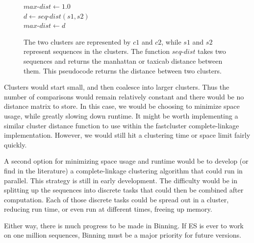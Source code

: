 \begin{figure}[h!]
\begin{algorithm}[H]
 \SetAlgoLined

\BlankLine
 $max$-$dist \gets 1.0$\\
  {
    {
    $d \gets seq$-$dist(s1, s2)$\\
     {
      $max$-$dist \gets d$
    }
   }
 }
\end{algorithm}
\caption[Pseudocode showing a distance function for two clusters.]{The two clusters are represented by $c1$ and $c2$, while $s1$ and $s2$ represent sequences in the clusters. The function $seq$-$dist$ takes two sequences and returns the manhattan or taxicab distance between them. This pseudocode returns the distance between two clusters.}
\label{code:LazyClustering}
\end{figure}


Clusters would start small, and then coalesce into larger clusters.
Thus the number of comparisons would remain relatively constant and there would be no distance matrix to store.
In this case, we would be choosing to minimize space usage, while greatly slowing down runtime.
It might be worth implementing a similar cluster distance function to use within the fastcluster complete-linkage implementation.
However, we would still hit a clustering time or space limit fairly quickly.

A second option for minimizing space usage and runtime would be to develop (or find in the literature) a complete-linkage clustering algorithm that could run in parallel.
This strategy is still in early development.
The difficulty would be in splitting up the sequences into discrete tasks that could then be combined after computation.
Each of those discrete tasks could be spread out in a cluster, reducing run time, or even run at different times, freeing up memory.

Either way, there is much progress to be made in Binning.
If ES is ever to work on one million sequences, Binning must be a major priority for future versions.

